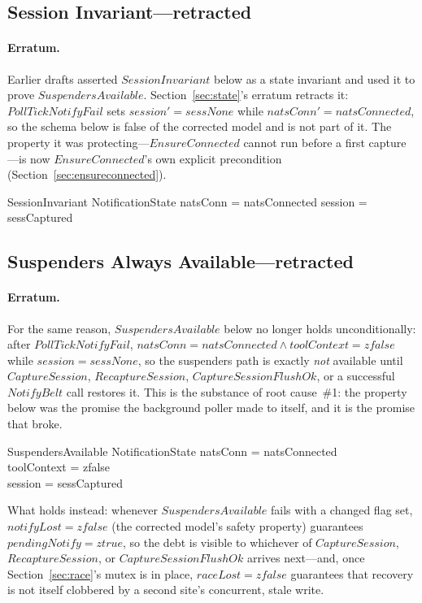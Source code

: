 \documentclass[a4paper,10pt,fleqn]{article}
\begin{document}
\subsection{Session Invariant---retracted}

\paragraph{Erratum.}  Earlier drafts asserted $SessionInvariant$ below
as a state invariant and used it to prove $SuspendersAvailable$.
Section~\ref{sec:state}'s erratum retracts it: $PollTickNotifyFail$
sets $session' = sessNone$ while $natsConn' = natsConnected$, so the
schema below is false of the corrected model and is not part of it.
The property it was protecting---$EnsureConnected$ cannot run before a
first capture---is now $EnsureConnected$'s own explicit precondition
(Section~\ref{sec:ensureconnected}).

\begin{schema}{SessionInvariant}
  NotificationState
  \where
  natsConn = natsConnected \implies session = sessCaptured
\end{schema}

\subsection{Suspenders Always Available---retracted}

\paragraph{Erratum.}  For the same reason, $SuspendersAvailable$ below
no longer holds unconditionally: after $PollTickNotifyFail$,
$natsConn = natsConnected \land toolContext = zfalse$ while
$session = sessNone$, so the suspenders path is exactly \emph{not}
available until $CaptureSession$, $RecaptureSession$,
$CaptureSessionFlushOk$, or a successful $NotifyBelt$ call restores it.
This is the substance of root cause~\#1: the property below was the
promise the background poller made to itself, and it is the promise
that broke.

\begin{schema}{SuspendersAvailable}
  NotificationState
  \where
  natsConn = natsConnected \\
  toolContext = zfalse \\
  session = sessCaptured
\end{schema}

What holds instead: whenever $SuspendersAvailable$ fails with a changed
flag set, $notifyLost = zfalse$ (the corrected model's safety property)
guarantees $pendingNotify = ztrue$, so the debt is visible to whichever
of $CaptureSession$, $RecaptureSession$, or $CaptureSessionFlushOk$
arrives next---and, once Section~\ref{sec:race}'s mutex is in place,
$raceLost = zfalse$ guarantees that recovery is not itself clobbered by
a second site's concurrent, stale write.
\end{document}

